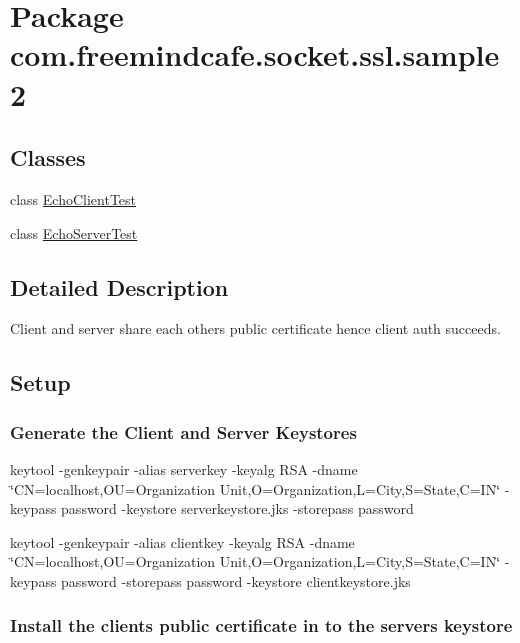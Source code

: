 \hypertarget{namespacecom_1_1freemindcafe_1_1socket_1_1ssl_1_1sample2}{}\section{Package com.\+freemindcafe.\+socket.\+ssl.\+sample2}
\label{namespacecom_1_1freemindcafe_1_1socket_1_1ssl_1_1sample2}
\subsection*{Classes}
\begin{DoxyCompactItemize}
\item 
class \hyperlink{classcom_1_1freemindcafe_1_1socket_1_1ssl_1_1sample2_1_1_echo_client_test}{Echo\+Client\+Test}
\item 
class \hyperlink{classcom_1_1freemindcafe_1_1socket_1_1ssl_1_1sample2_1_1_echo_server_test}{Echo\+Server\+Test}
\end{DoxyCompactItemize}


\subsection{Detailed Description}
Client and server share each others public certificate hence client auth succeeds.

\subsection*{Setup}

\subsubsection*{Generate the Client and Server Keystores}


\begin{DoxyItemize}
\item keytool -\/genkeypair -\/alias serverkey -\/keyalg R\+S\+A -\/dname \char`\"{}\+C\+N=localhost,\+O\+U=\+Organization Unit,\+O=\+Organization,\+L=\+City,\+S=\+State,\+C=\+I\+N\char`\"{} -\/keypass password -\/keystore serverkeystore.\+jks -\/storepass password 
\item keytool -\/genkeypair -\/alias clientkey -\/keyalg R\+S\+A -\/dname \char`\"{}\+C\+N=localhost,\+O\+U=\+Organization Unit,\+O=\+Organization,\+L=\+City,\+S=\+State,\+C=\+I\+N\char`\"{} -\/keypass password -\/storepass password -\/keystore clientkeystore.\+jks 
\end{DoxyItemize}\subsubsection*{Install the clients public certificate in to the servers keystore}


